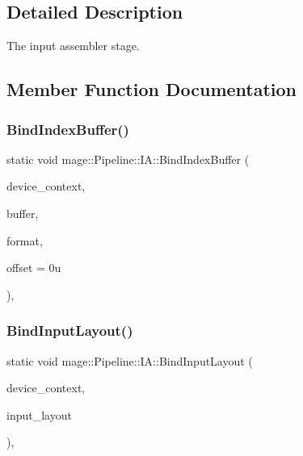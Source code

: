 \subsection{Detailed Description}
The input assembler stage. 

\subsection{Member Function Documentation}
\hypertarget{structmage_1_1_pipeline_1_1_i_a_a93bfdb872e9f2ed8d7530d2096d19612}{}\label{structmage_1_1_pipeline_1_1_i_a_a93bfdb872e9f2ed8d7530d2096d19612} 
\subsubsection{\texorpdfstring{Bind\+Index\+Buffer()}{BindIndexBuffer()}}
{\footnotesize\ttfamily static void mage\+::\+Pipeline\+::\+I\+A\+::\+Bind\+Index\+Buffer (\begin{DoxyParamCaption}\item[{I\+D3\+D11\+Device\+Context4 $\ast$}]{device\+\_\+context,  }\item[{I\+D3\+D11\+Buffer $\ast$}]{buffer,  }\item[{D\+X\+G\+I\+\_\+\+F\+O\+R\+M\+AT}]{format,  }\item[{\hyperlink{namespacemage_a41c104c036fba3756a74e19f793eeaa1}{U32}}]{offset = {\ttfamily 0u} }\end{DoxyParamCaption})\hspace{0.3cm}{\ttfamily [static]}, {\ttfamily [noexcept]}}

\hypertarget{structmage_1_1_pipeline_1_1_i_a_ae9aa0db517b6ab2fa56d30e4dbc804e7}{}\label{structmage_1_1_pipeline_1_1_i_a_ae9aa0db517b6ab2fa56d30e4dbc804e7} 
\subsubsection{\texorpdfstring{Bind\+Input\+Layout()}{BindInputLayout()}}
{\footnotesize\ttfamily static void mage\+::\+Pipeline\+::\+I\+A\+::\+Bind\+Input\+Layout (\begin{DoxyParamCaption}\item[{I\+D3\+D11\+Device\+Context4 $\ast$}]{device\+\_\+context,  }\item[{I\+D3\+D11\+Input\+Layout $\ast$}]{input\+\_\+layout }\end{DoxyParamCaption})\hspace{0.3cm}{\ttfamily [static]}, {\ttfamily [noexcept]}}

